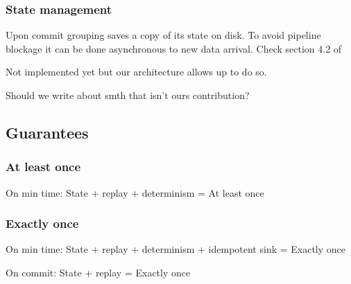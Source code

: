 \subsubsection{State management}
Upon commit grouping saves a copy of its state on disk. To avoid pipeline blockage it can be done asynchronous to new data arrival. Check section 4.2 of \cite{Carbone:2017:SMA:3137765.3137777}

Not implemented yet but our architecture allows up to do so. 

Should we write about smth that isn't ours contribution?

\subsection{Guarantees}

\subsubsection{At least once}
On min time: State + replay + determinism = At least once

\subsubsection{Exactly once}
On min time: State + replay + determinism + idempotent sink = Exactly once

On commit: State + replay = Exactly once



